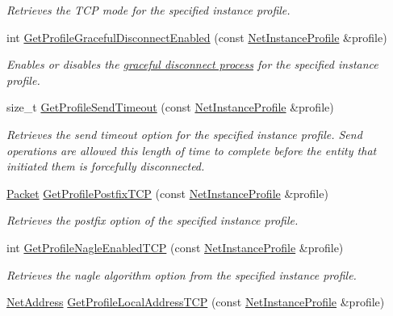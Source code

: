 \begin{DoxyCompactItemize}
\begin{DoxyCompactList}\small\item\em Retrieves the TCP mode for the specified instance profile. \item\end{DoxyCompactList}\item 
int \hyperlink{namespacemn_a954a7dd680e686b203ff77a77dd5ab91}{GetProfileGracefulDisconnectEnabled} (const \hyperlink{class_net_instance_profile}{NetInstanceProfile} \&profile)
\begin{DoxyCompactList}\small\item\em Enables or disables the \hyperlink{graceful_disconnect_page}{graceful disconnect process} for the specified instance profile. \item\end{DoxyCompactList}\item 
size\_\-t \hyperlink{namespacemn_a6cbfb2045db8a67cf6d02b372512018b}{GetProfileSendTimeout} (const \hyperlink{class_net_instance_profile}{NetInstanceProfile} \&profile)
\begin{DoxyCompactList}\small\item\em Retrieves the send timeout option for the specified instance profile. Send operations are allowed this length of time to complete before the entity that initiated them is forcefully disconnected. \item\end{DoxyCompactList}\item 
\hyperlink{class_packet}{Packet} \hyperlink{namespacemn_a87cddb55f8b9e37e079da963fcb3ffc2}{GetProfilePostfixTCP} (const \hyperlink{class_net_instance_profile}{NetInstanceProfile} \&profile)
\begin{DoxyCompactList}\small\item\em Retrieves the postfix option of the specified instance profile. \item\end{DoxyCompactList}\item 
int \hyperlink{namespacemn_a391ffe530a30a3016f8d11e6a3d0068d}{GetProfileNagleEnabledTCP} (const \hyperlink{class_net_instance_profile}{NetInstanceProfile} \&profile)
\begin{DoxyCompactList}\small\item\em Retrieves the nagle algorithm option from the specified instance profile. \item\end{DoxyCompactList}\item 
\hyperlink{class_net_address}{NetAddress} \hyperlink{namespacemn_ae8a6606bc8aef43bd3ca74772ee7118d}{GetProfileLocalAddressTCP} (const \hyperlink{class_net_instance_profile}{NetInstanceProfile} \&profile)

\end{DoxyCompactItemize}
